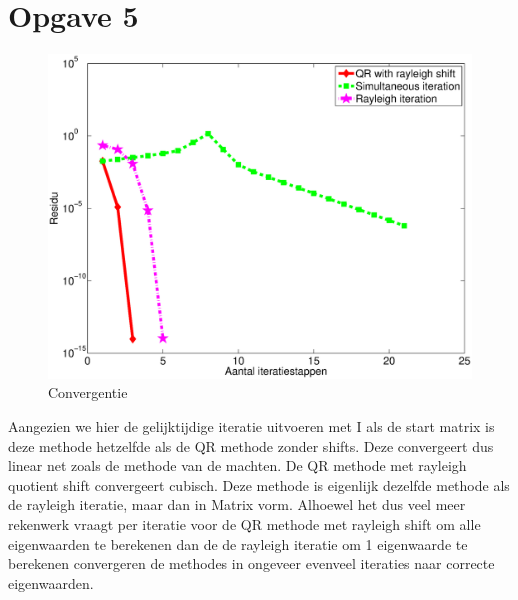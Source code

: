 \documentclass[]{article}
\newcommand{\opgave}[1]{\section*{Opgave #1}}
\begin{document}
\opgave5

\begin{figure}
\noindent \includegraphics[width=1\linewidth]{Opgave5.eps}
\caption{Convergentie}
\label{figuurtje}
\end{figure}



Aangezien we hier de gelijktijdige iteratie uitvoeren met I als de start matrix is deze methode hetzelfde als de QR methode zonder shifts. Deze convergeert dus linear net zoals de methode van de machten. De QR methode met rayleigh quotient shift convergeert cubisch. Deze methode is eigenlijk dezelfde methode als de rayleigh iteratie, maar dan in Matrix vorm. Alhoewel het dus veel meer rekenwerk vraagt per iteratie voor de QR methode met rayleigh  shift om alle eigenwaarden te berekenen dan de de rayleigh iteratie om 1 eigenwaarde te berekenen convergeren de methodes in ongeveer evenveel iteraties naar correcte eigenwaarden.
\end{document}
